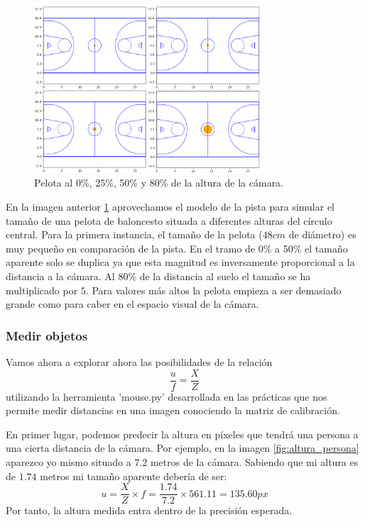 \documentclass[12pt]{article}
\begin{document}
\begin{figure}[H]
    \centering
    \includegraphics[width=0.75\textwidth]{images_calibracion/Pelota.png}  
    \caption{Pelota al 0\%, 25\%, 50\% y 80\% de la altura de la cámara.}
    \label{fig:pelota}
\end{figure}

En la imagen anterior \ref{fig:pelota} aprovechamos el modelo de la pista para simular el tamaño de una pelota de baloncesto situada a diferentes alturas del círculo central.
Para la primera instancia, el tamaño de la pelota ($48 cm$ de diámetro) es muy pequeño en comparación de la pista. En el tramo de 0\% a 50\% el tamaño aparente solo se duplica ya que esta magnitud es inversamente proporcional a la distancia a la cámara.
Al 80\% de la distancia al suelo el tamaño se ha multiplicado por $5$. Para valores más altos la pelota empieza a ser demasiado grande como para caber en el espacio visual de la cámara.

\subsubsection{Medir objetos}

Vamos ahora a explorar ahora las posibilidades de la relación
$$
\frac{u}{f} = \frac{X}{Z}
$$
utilizando la herramienta 'mouse.py' desarrollada en las prácticas que nos permite medir distancias en una imagen conociendo la matriz de calibración.

En primer lugar, podemos predecir la altura en píxeles que tendrá una persona a una cierta distancia de la cámara. 
Por ejemplo, en la imagen \ref{fig:altura_persona} aparezco yo mismo situado a $7.2$ metros de la cámara. Sabiendo que mi altura es de $1.74$ metros mi tamaño aparente debería de ser:
$$u=\frac{X}{Z} \times f = \frac{1.74}{7.2} \times 561.11 = 135.60 px$$
Por tanto, la altura medida entra dentro de la precisión esperada.
\end{document}
